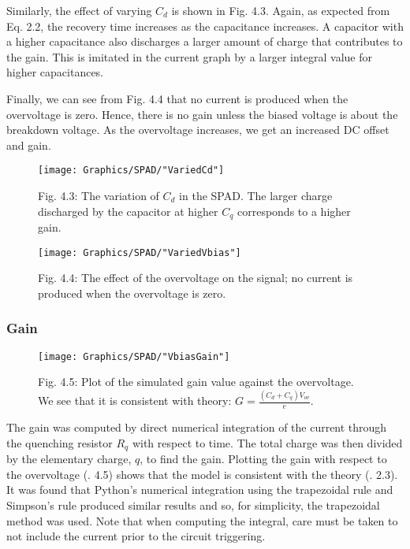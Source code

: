 Similarly, the effect of varying $C_d$ is shown in Fig. 4.3. Again, as expected from Eq. 2.2, the recovery time increases as the capacitance increases. A capacitor with a higher capacitance also discharges a larger amount of charge that contributes to the gain. This is imitated in the current graph by a larger integral value for higher capacitances.

Finally, we can see from Fig. 4.4 that no current is produced when the overvoltage is zero. Hence, there is no gain unless the biased voltage is about the breakdown voltage. As the overvoltage increases, we get an increased DC offset and gain.

\begin{figure}[h]
  \centering
  \texttt{[image: Graphics/SPAD/"VariedCd"]}
  {\caption*{Fig. 4.3: The variation of $C_d$ in the SPAD. The larger charge discharged by the capacitor at higher $C_q$ corresponds to a higher gain.}}
\end{figure}

\begin{figure}[h]
  \centering
  \texttt{[image: Graphics/SPAD/"VariedVbias"]}
  {\caption*{Fig. 4.4: The effect of the overvoltage on the signal; no current is produced when the overvoltage is zero.}}
\end{figure}

\subsubsection{Gain}

\begin{figure}[h]
  \centering
  \texttt{[image: Graphics/SPAD/"VbiasGain"]}
  {\caption*{Fig. 4.5: Plot of the simulated gain value against the overvoltage. We see that it is consistent with theory:  $G=\frac{(C_d+C_q)V_{ov}}{e}.$}}
\end{figure}

The gain was computed by direct numerical integration of the current through the quenching resistor $R_q$ with respect to time. The total charge was then divided by the elementary charge, $q$, to find the gain. Plotting the gain with respect to the overvoltage (\Fig. 4.5) shows that the model is consistent with the theory (\Eq. 2.3). It was found that Python's numerical integration using the trapezoidal rule and Simpson's rule produced similar results and so, for simplicity, the trapezoidal method was used. Note that when computing the integral, care must be taken to not include the current prior to the circuit triggering.

